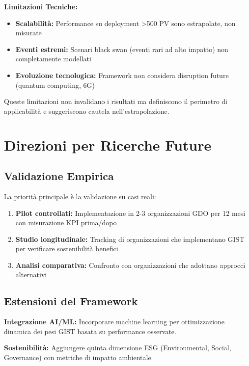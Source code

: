 \textbf{Limitazioni Tecniche:}
\begin{itemize}
\item \textbf{Scalabilità:} Performance su deployment >500 PV sono estrapolate, non misurate
\item \textbf{Eventi estremi:} Scenari black swan (eventi rari ad alto impatto) non completamente modellati
\item \textbf{Evoluzione tecnologica:} Framework non considera disruption future (quantum computing, 6G)
\end{itemize}

Queste limitazioni non invalidano i risultati ma definiscono il perimetro di applicabilità e suggeriscono cautela nell'estrapolazione.

\section{Direzioni per Ricerche Future}
\label{sec:ricerche_future}

\subsection{Validazione Empirica}
\label{subsec:validazione_empirica}

La priorità principale è la validazione su casi reali:
\begin{enumerate}
\item \textbf{Pilot controllati:} Implementazione in 2-3 organizzazioni GDO per 12 mesi con misurazione KPI prima/dopo
\item \textbf{Studio longitudinale:} Tracking di organizzazioni che implementano GIST per verificare sostenibilità benefici
\item \textbf{Analisi comparativa:} Confronto con organizzazioni che adottano approcci alternativi
\end{enumerate}

\subsection{Estensioni del Framework}
\label{subsec:estensioni}

\textbf{Integrazione AI/ML:} Incorporare machine learning per ottimizzazione dinamica dei pesi GIST basata su performance osservate.

\textbf{Sostenibilità:} Aggiungere quinta dimensione ESG (Environmental, Social, Governance) con metriche di impatto ambientale.

